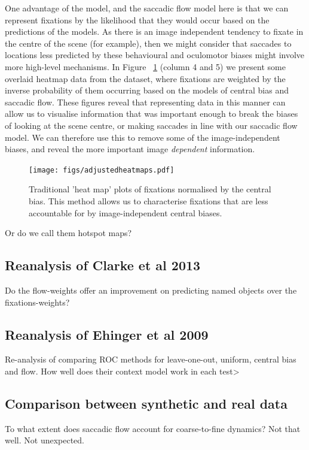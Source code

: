 One advantage of the \citep{clarke-tatler2014} model, and the saccadic flow model here is that we can represent fixations by the likelihood that they would occur based on the predictions of the models. As there is an image independent tendency to fixate in the centre of the scene (for example), then we might consider that saccades to locations less predicted by these behavioural and oculomotor biases might involve more high-level mechanisms. In Figure ~\ref{fig:adjustedHeatmaps} (column 4 and 5) we present some overlaid heatmap data from the \citep{clarke2013} dataset, where fixations are weighted by the inverse probability of them occurring based on the models of central bias and saccadic flow. These figures reveal that representing data in this manner can allow us to visualise information that was important enough to break the biases of looking at the scene centre, or making saccades in line with our saccadic flow model. We can therefore use this to remove some of the image-independent biases, and reveal the more important image \emph{dependent} information.

\begin{figure}
\texttt{[image: figs/adjustedheatmaps.pdf]}
\caption{Traditional 'heat map' plots of fixations normalised by the central bias. This method allows us to characterise fixations that are less accountable for by image-independent central biases.}
\label{fig:adjustedHeatmaps}
\end{figure}

Or do we call them hotspot maps?

\subsection{Reanalysis of Clarke et al 2013}
\label{sec:reanalysisClarke2013}
Do the flow-weights offer an improvement on predicting named objects over the fixations-weights?

\subsection{Reanalysis of Ehinger et al 2009}

Re-analysis of \cite{ehinger2009} comparing ROC methods for leave-one-out, uniform, central bias and flow. How well does their context model work in each test>

\subsection{Comparison between synthetic and real data}
\label{sec:humanComp}
To what extent does saccadic flow account for coarse-to-fine dynamics? Not that well. Not unexpected.

